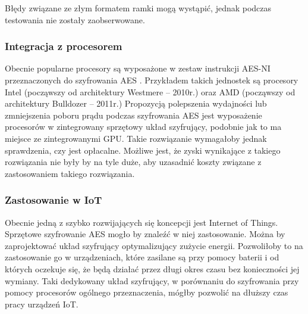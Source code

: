 Błędy związane ze złym formatem ramki mogą wystąpić, jednak podczas testowania nie zostały zaobserwowane.

\subsubsection{Integracja z procesorem}
Obecnie popularne procesory są wyposażone w zestaw instrukcji AES-NI przeznaczonych do szyfrowania AES \cite{aes-processors}. Przykładem takich jednostek są procesory Intel (począwszy od architektury Westmere -- 2010r.) oraz AMD (począwszy od architektury Bulldozer -- 2011r.) Propozycją polepszenia wydajności lub zmniejszenia poboru prądu podczas szyfrowania AES jest wyposażenie procesorów w zintegrowany sprzętowy układ szyfrujący, podobnie jak to ma miejsce ze zintegrowanymi GPU. Takie rozwiązanie wymagałoby jednak sprawdzenia, czy jest opłacalne. Możliwe jest, że zyski wynikające z takiego rozwiązania nie były by na tyle duże, aby uzasadnić koszty związane z zastosowaniem takiego rozwiązania.

\subsubsection{Zastosowanie w IoT}
Obecnie jedną z szybko rozwijających się koncepcji jest Internet of Things. Sprzętowe szyfrowanie AES mogło by znaleźć w niej zastosowanie. Można by zaprojektować układ szyfrujący optymalizujący zużycie energii. Pozwoliłoby to na zastosowanie go w urządzeniach, które zasilane są przy pomocy baterii i od których oczekuje się, że będą działać przez długi okres czasu bez konieczności jej wymiany. Taki dedykowany układ  szyfrujący, w porównaniu do szyfrowania przy pomocy procesorów ogólnego przeznaczenia, mógłby pozwolić na dłuższy czas pracy urządzeń IoT.




\newpage